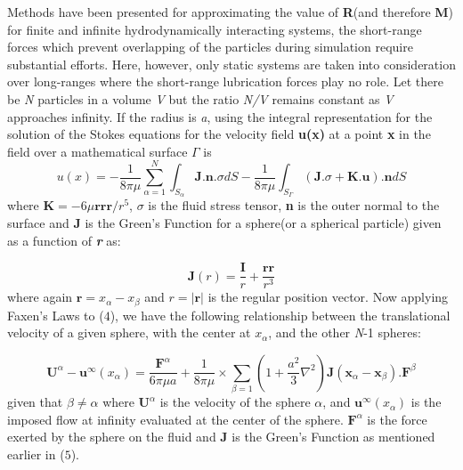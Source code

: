\documentclass[12pt]{article}
\begin{document}
Methods have been presented for approximating the value of \textbf{R}(and therefore \textbf{M}) for finite and infinite hydrodynamically interacting systems, the short-range forces which prevent overlapping of the particles during simulation require substantial efforts. Here, however, only static systems are taken into consideration over long-ranges where the short-range lubrication forces play no role. Let there be \textit{N} particles in a volume \textit{V} but the ratio \textit{N/V} remains constant as \textit{V} approaches infinity. If the radius is \textit{a}, using the integral representation for the solution of the Stokes equations for the velocity field \textbf{u(x)} at a point \textbf{x} in the field over a mathematical surface $\Gamma$ is 
\begin{equation} 
\label{eq4}
u(x)=-\frac{1}{8\pi\mu} \sum_{\alpha=1}^{\textit{N}} \int_{S_{\alpha}} \textbf{J.n}.\sigma dS -\frac{1}{8\pi\mu} \int_{S_\Gamma} (\textbf{J.}\sigma + \textbf{K.u})\textbf{.n}  dS
\end{equation}
where $\textbf{K} = -6 \mu \textbf{rrr}/r^5$, $\sigma$ is the fluid stress tensor, \textbf{n} is the outer normal to the surface and \textbf{J} is the Green's Function for a sphere(or a spherical particle) given as a function of \textbf{\textit{r}} as:

\begin{equation} \label{eq5}
\textbf{J}(r)=\frac{\textbf{I}}{r} + \frac{\textbf{rr}}{r^3}
\end{equation}
where again $\textbf{r}=x_\alpha - x_\beta$ and $r=\vert \textbf{r} \vert$ is the  regular position vector. Now applying Faxen's Laws to ($4$), we have the following relationship between the translational velocity of a given sphere, with the center at $x_\alpha$, and the other \textit{N}-1 spheres:


\begin{equation}
\label{eq6}
\textbf{U}^{\alpha}-\textbf{u}^{\infty}(x_\alpha)=\frac{\textbf{F}^{\alpha}}{6 \pi \mu a}+\frac{1}{8 \pi \mu} \times \sum_{\beta=1} \left(1+\frac{a^2}{3} \nabla ^2 \right) \textbf{J}(\textbf{x}_\alpha - \textbf{x}_\beta).\textbf{F}^{\beta}
\end{equation}
given that $\beta \neq \alpha$ where $\textbf{U}^{\alpha}$ is the velocity of the sphere $\alpha$, and $\textbf{u}^{\infty}(x_\alpha)$ is the imposed flow at infinity evaluated at the center of the sphere. $\textbf{F}^{\alpha}$ is the force exerted by the sphere on the fluid and \textbf{J} is the Green's Function as mentioned earlier in ($5$). 
\end{document}
